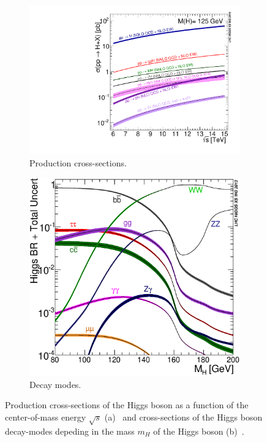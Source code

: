 \begin{figure}[htb]
    \centering
    \begin{subfigure}[t]{0.45\textwidth}
        \includegraphics[width=\textwidth]{./figures/theory/higgs_xsec_production.pdf}
        \caption{Production cross-sections.}\label{fig:theory:higgs:xsecs}
    \end{subfigure}
    \begin{subfigure}[t]{0.45\textwidth}
        \includegraphics[width=\textwidth]{./figures/theory/higgs_xsec_decay.eps}
        \caption{Decay modes.}\label{fig:theory:higgs:decay}
    \end{subfigure}
    \caption{Production cross-sections of the Higgs boson as a function of the center-of-mass energy $\sqrt{s}$ (a)~\cite{YR4}
             and cross-sections of the Higgs boson decay-modes depeding in the mass $m_H$ of the Higgs boson (b)~\cite{YR3}.}
\end{figure}

